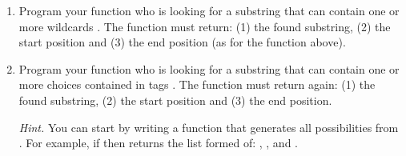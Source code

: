 \documentclass[11pt,class=report,crop=false]{standalone}
\begin{document}
\begin{activite}


\begin{enumerate}
  \item Program your function 
  who is looking for a substring that can contain one or more wildcards \og{}\fg{}.
  The function must return: (1) the found substring, (2) the start position and (3) the end position (as for the function  above).
  
  
  \item Program your function 
  who is looking for a substring that can contain one or more choices contained in tags \og{}\mot{[]}\fg{}. The function must return again: (1) the found substring, (2) the start position and (3) the end position.  
  
  \emph{Hint.} You can start by writing a function  that generates all possibilities from . For example, if 
   then  returns the list formed of:
  , ,  and .
    
\end{enumerate}   
     
\end{activite}


\newcommand{\rzero}{{\color{red}\textbf{0}}}
\newcommand{\run}{{\color{blue}\textbf{1}}}
\end{document}
